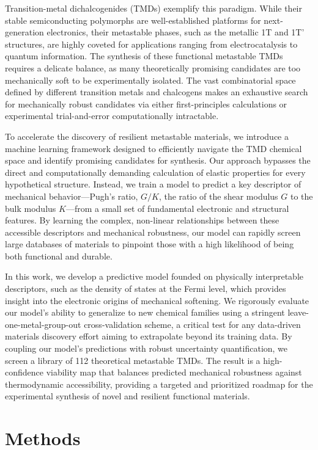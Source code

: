 \documentclass[]{article}
\begin{document}
Transition-metal dichalcogenides (TMDs) exemplify this paradigm. While their stable semiconducting polymorphs are well-established platforms for next-generation electronics, their metastable phases, such as the metallic 1T and 1T' structures, are highly coveted for applications ranging from electrocatalysis to quantum information. The synthesis of these functional metastable TMDs requires a delicate balance, as many theoretically promising candidates are too mechanically soft to be experimentally isolated. The vast combinatorial space defined by different transition metals and chalcogens makes an exhaustive search for mechanically robust candidates via either first-principles calculations or experimental trial-and-error computationally intractable.

To accelerate the discovery of resilient metastable materials, we introduce a machine learning framework designed to efficiently navigate the TMD chemical space and identify promising candidates for synthesis. Our approach bypasses the direct and computationally demanding calculation of elastic properties for every hypothetical structure. Instead, we train a model to predict a key descriptor of mechanical behavior—Pugh's ratio, $G/K$, the ratio of the shear modulus $G$ to the bulk modulus $K$—from a small set of fundamental electronic and structural features. By learning the complex, non-linear relationships between these accessible descriptors and mechanical robustness, our model can rapidly screen large databases of materials to pinpoint those with a high likelihood of being both functional and durable.

In this work, we develop a predictive model founded on physically interpretable descriptors, such as the density of states at the Fermi level, which provides insight into the electronic origins of mechanical softening. We rigorously evaluate our model's ability to generalize to new chemical families using a stringent leave-one-metal-group-out cross-validation scheme, a critical test for any data-driven materials discovery effort aiming to extrapolate beyond its training data. By coupling our model's predictions with robust uncertainty quantification, we screen a library of 112 theoretical metastable TMDs. The result is a high-confidence viability map that balances predicted mechanical robustness against thermodynamic accessibility, providing a targeted and prioritized roadmap for the experimental synthesis of novel and resilient functional materials.

\section{Methods}
\label{sec:methods}
\end{document}
